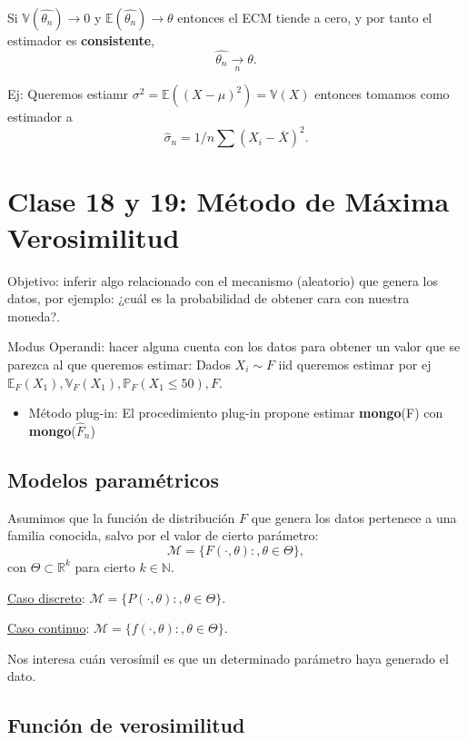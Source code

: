 \documentclass[a4paper,12pt]{article}
\theoremstyle{definition}
\numberwithin{prop}{section}
\theoremstyle{remark}
\numberwithin{ej_subseccion}{subsection}
\newcommand{\N}{\mathbb{N}}
\newcommand{\R}{\mathbb{R}}
\begin{document}
	Si $\mathbb{V}(\hat{\theta_n})\rightarrow 0$ y $\mathbb{E}(\hat{\theta_n})\rightarrow \theta$ entonces el ECM tiende a cero, y por tanto el estimador es \textbf{consistente},
	$$\hat{\theta_n}\xrightarrow[n]{}\theta.$$

	Ej: Queremos estiamr $\sigma^2=\mathbb{E}((X-\mu)^2)=\mathbb{V}(X)$ entonces tomamos como estimador a 
	$$\hat{\sigma}_n=1/n \sum (X_i-\overline{X})^2.$$

	\section*{Clase 18 y 19: Método de Máxima Verosimilitud}
	
	Objetivo: inferir algo relacionado con el mecanismo
	(aleatorio) que genera los datos, por ejemplo:
	¿cuál es la probabilidad de obtener cara con nuestra moneda?.
	
	Modus Operandi: hacer alguna cuenta con los datos para
	obtener un valor que se parezca al que queremos estimar: Dados $X_i\sim F$ iid queremos estimar por ej $\mathbb{E}_F(X_1),\mathbb{V}_F(X_1),\mathbb{P}_F(X_1\leq 50), F$.
	
	\begin{itemize}
		\item Método plug-in: El procedimiento plug-in propone
		estimar \textbf{mongo}(F) con \textbf{mongo}($\hat{F}_n$)
	\end{itemize}
	
	\subsection*{Modelos paramétricos}
	Asumimos que la función de distribución $F$ que genera los datos pertenece a una familia conocida, salvo por el valor de cierto	parámetro:
	$$\mathcal{M} = \{F(\cdot, \theta): , \theta \in \Theta\},$$
	con $\Theta\subset \R^k$ para cierto $k\in\N$.
	
	\underline{Caso discreto}: $\mathcal{M} = \{P(\cdot, \theta): , \theta \in \Theta\}$.

	\underline{Caso continuo}: $\mathcal{M} = \{f(\cdot, \theta): , \theta \in \Theta\}$.
	
	Nos interesa cuán verosímil es que un determinado parámetro haya generado el dato.
	
	\subsection*{Función de verosimilitud}
	
\end{document}
